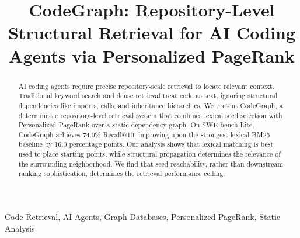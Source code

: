 \documentclass[conference]{IEEEtran}
\begin{document}
\title{CodeGraph: Repository-Level Structural Retrieval for AI Coding Agents via Personalized PageRank}

\author{
}

\maketitle

\begin{abstract}
AI coding agents require precise repository-scale retrieval to locate relevant context. Traditional keyword search and dense retrieval treat code as text, ignoring structural dependencies like imports, calls, and inheritance hierarchies. We present CodeGraph, a deterministic repository-level retrieval system that combines lexical seed selection with Personalized PageRank over a static dependency graph. On SWE-bench Lite, CodeGraph achieves 74.0\% Recall@10, improving upon the strongest lexical BM25 baseline by 16.0 percentage points. Our analysis shows that lexical matching is best used to place starting points, while structural propagation determines the relevance of the surrounding neighborhood. We find that seed reachability, rather than downstream ranking sophistication, determines the retrieval performance ceiling.
\end{abstract}

\begin{IEEEkeywords}
Code Retrieval, AI Agents, Graph Databases, Personalized PageRank, Static Analysis
\end{IEEEkeywords}












\end{document}
